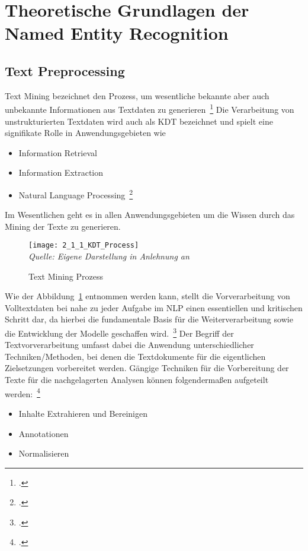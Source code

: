 \newpage
\section{Theoretische Grundlagen der Named Entity Recognition} \label{infos}

\subsection{Text Preprocessing} \label{TextPreprocessing}
Text Mining bezeichnet den Prozess, um wesentliche bekannte aber auch unbekannte Informationen aus Textdaten zu
generieren~\footcite[\vglf][]{mohan.2015}
Die Verarbeitung von unstrukturierten Textdaten wird auch als \ac{KDT}
bezeichnet und spielt eine signifikate Rolle in Anwendungsgebieten wie

\begin{itemize}
    \item Information Retrieval
    \item Information Extraction
    \item Natural Language Processing~\footcite[\vglf][ f.]{mohan.2015}
\end{itemize}
Im Wesentlichen geht es in allen \og Anwendungsgebieten um die Wissen durch das Mining der Texte zu generieren.

\begin{figure}[H]
    \caption{Text Mining Prozess}\label{fig:2_1_1_KDT_Process}
    \texttt{[image: 2\_1\_1\_KDT\_Process]}
    \\
    \textit{Quelle: Eigene Darstellung in Anlehnung an}~\cite[]{mohan.2015}
\end{figure}

Wie der Abbildung~\ref{fig:2_1_1_KDT_Process} entnommen werden kann, stellt die Vorverarbeitung von Volltextdaten bei nahe
zu jeder Aufgabe im \ac{NLP} einen essentiellen und kritischen Schritt dar,
da hierbei die fundamentale Basis für die Weiterverarbeitung
sowie die Entwicklung der Modelle geschaffen wird.~\footcite[\vglf][]{gurusamy.2014}
Der Begriff der Textvorverarbeitung umfasst dabei die Anwendung unterschiedlicher Techniken/Methoden, bei
denen die Textdokumente für die eigentlichen Zielsetzungen vorbereitet werden.
Gängige Techniken für die Vorbereitung der Texte für die nachgelagerten Analysen können folgendermaßen aufgeteilt
werden:~\footcite[\vglf][]{pahwa.2018}

\begin{itemize}
    \item Inhalte Extrahieren und Bereinigen
    \item Annotationen
    \item Normalisieren
\end{itemize}

